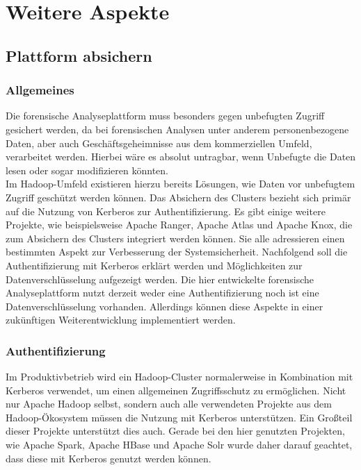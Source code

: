 \chapter{Weitere Aspekte}
\label{ch:additional_aspects}

\section{Plattform absichern}
\label{sec:secure_platform}
\subsection{Allgemeines}
Die forensische Analyseplattform muss besonders gegen unbefugten Zugriff gesichert werden, da bei forensischen Analysen unter anderem personenbezogene Daten, aber auch Geschäftsgeheimnisse aus dem kommerziellen Umfeld, verarbeitet werden. Hierbei wäre es absolut untragbar, wenn Unbefugte die Daten lesen oder sogar modifizieren könnten.\\

\noindent
Im Hadoop-Umfeld existieren hierzu bereits Lösungen, wie Daten vor unbefugtem Zugriff geschützt werden können. Das Absichern des Clusters bezieht sich primär auf die Nutzung von Kerberos zur Authentifizierung. Es gibt einige weitere Projekte, wie beispielsweise Apache Ranger, Apache Atlas und Apache Knox, die zum Absichern des Clusters integriert werden können. Sie alle adressieren einen bestimmten Aspekt zur Verbesserung der Systemsicherheit. Nachfolgend soll die Authentifizierung mit Kerberos erklärt werden und Möglichkeiten zur Datenverschlüsselung aufgezeigt werden. Die hier entwickelte forensische Analyseplattform nutzt derzeit weder eine Authentifizierung noch ist eine Datenverschlüsselung vorhanden. Allerdings können diese Aspekte in einer zukünftigen Weiterentwicklung implementiert werden.

\subsection{Authentifizierung}

Im Produktivbetrieb wird ein Hadoop-Cluster normalerweise in Kombination mit Kerberos verwendet, um einen allgemeinen Zugriffsschutz zu ermöglichen.\cite{hadoop_security} Nicht nur Apache Hadoop selbst, sondern auch alle verwendeten Projekte aus dem Hadoop-Ökosystem müssen die Nutzung mit Kerberos unterstützen. Ein Großteil dieser Projekte unterstützt dies auch. Gerade bei den hier genutzten Projekten, wie Apache Spark, Apache HBase und Apache Solr wurde daher darauf geachtet, dass diese mit Kerberos genutzt werden können.\\

